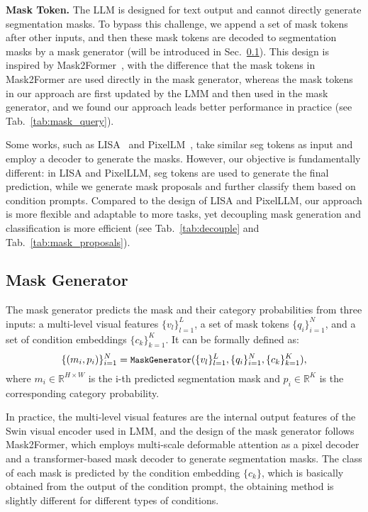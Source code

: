 \noindent\textbf{Mask Token.} The LLM is designed for text output and cannot directly generate segmentation masks. To bypass this challenge, we append a set of mask tokens after other inputs, and then these mask tokens are decoded to segmentation masks by a mask generator (will be introduced in Sec.~\ref{sec:mask_generator}). This design is inspired by Mask2Former~\cite{mask2former}, with the difference that the mask tokens in Mask2Former are used directly in the mask generator, whereas the mask tokens in our approach are first updated by the LMM and then used in the mask generator, and we found our approach leads better performance in practice (see Tab.~\ref{tab:mask_query}).

Some works, such as LISA~\cite{lisa} and PixelLM~\cite{pixellm}, take similar seg tokens as input and employ a decoder to generate the masks. However, our objective is fundamentally different: in LISA and PixelLLM, seg tokens are used to generate the final prediction, while we generate mask proposals and further classify them based on condition prompts. Compared to the design of LISA and PixelLLM, our approach is more flexible and adaptable to more tasks, yet decoupling mask generation and classification is more efficient (see Tab.~\ref{tab:decouple} and Tab.~\ref{tab:mask_proposals}).

\subsection{Mask Generator}
\label{sec:mask_generator}
The mask generator predicts the mask and their category probabilities from three inputs: a multi-level visual features $\{v_{l}\}_{l=1}^{L}$, a set of mask tokens $\{q_i\}_{i=1}^{N}$, and a set of condition embeddings $\{c_{k}\}_{k=1}^{K}$. It can be formally defined as:
\begin{equation}
    \small
    \{(m_{i}, p_{i})\}_{i=1}^{N} = \texttt{MaskGenerator}(\{v_{l}\}_{l=1}^{L}, \{q_{i}\}_{i=1}^{N}, \{c_{k}\}_{k=1}^{K}),
\end{equation}
where $m_{i}\in \mathbb{R}^{H\times W}$ is the i-th predicted segmentation mask and $p_{i}\in \mathbb{R}^{K}$ is the corresponding category probability. 

In practice, the multi-level visual features are the internal output features of the Swin visual encoder used in LMM, and the design of the mask generator follows Mask2Former, which employs multi-scale deformable attention as a pixel decoder and a transformer-based mask decoder to generate segmentation masks. The class of each mask is predicted by the condition embedding $\{c_{k}\}$, which is basically obtained from the output of the condition prompt, the obtaining method is slightly different for different types of conditions.

